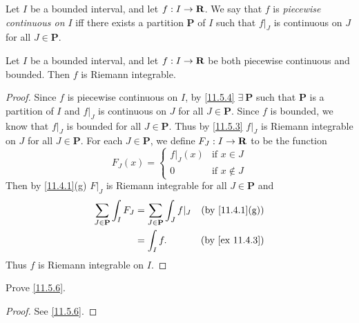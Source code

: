 \begin{definition}\label{11.5.4}
  Let \(I\) be a bounded interval, and let \(f : I \to \mathbf{R}\).
  We say that \(f\) is \emph{piecewise continuous on \(I\)} iff there exists a partition \(\mathbf{P}\) of \(I\) such that \(f|_J\) is continuous on \(J\) for all \(J \in \mathbf{P}\).
\end{definition}

\setcounter{theorem}{5}
\begin{proposition}\label{11.5.6}
  Let \(I\) be a bounded interval, and let \(f : I \to \mathbf{R}\) be both piecewise continuous and bounded.
  Then \(f\) is Riemann integrable.
\end{proposition}

\begin{proof}
  Since \(f\) is piecewise continuous on \(I\), by \cref{11.5.4} \(\exists\ \mathbf{P}\) such that \(\mathbf{P}\) is a partition of \(I\) and \(f|_J\) is continuous on \(J\) for all \(J \in \mathbf{P}\).
  Since \(f\) is bounded, we know that \(f|_J\) is bounded for all \(J \in \mathbf{P}\).
  Thus by \cref{11.5.3} \(f|_J\) is Riemann integrable on \(J\) for all \(J \in \mathbf{P}\).
  For each \(J \in \mathbf{P}\), we define \(F_J : I \to \mathbf{R}\) to be the function
  \[
    F_J(x) = \begin{cases}
      f|_J(x) & \text{if } x \in J    \\
      0       & \text{if } x \notin J
    \end{cases}
  \]
  Then by \cref{11.4.1}(g) \(F|_J\) is Riemann integrable for all \(J \in \mathbf{P}\) and
  \begin{align*}
    \sum_{J \in \mathbf{P}} \int_I F_J & = \sum_{J \in \mathbf{P}} \int_J f|_J & \text{(by \cref{11.4.1}(g))} \\
                                       & = \int_I f.                           & \text{(by \cref{ex 11.4.3})}
  \end{align*}
  Thus \(f\) is Riemann integrable on \(I\).
\end{proof}

\exercisesection

\begin{exercise}\label{ex 11.5.1}
  Prove \cref{11.5.6}.
\end{exercise}

\begin{proof}
  See \cref{11.5.6}.
\end{proof}